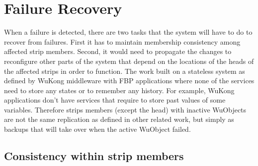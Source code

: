 \section{Failure Recovery}
\label{s:fr}

When a failure is detected, there are two tasks that the system will have to do
to recover from failures. First it has to maintain membership consistency among
affected strip members. Second, it would need to propagate the changes to
reconfigure other parts of the system that depend on the locations of the heads
of the affected strips in order to function. The work built on a stateless
system as defined by WuKong middleware with FBP applications where none of the
services need to store any states or to remember any history. For example,
WuKong applications don't have services that require to store past values of
some variables. Therefore strips members (except the head) with inactive
WuObjects are not the same replication as defined in other related work, but
simply as backups that will take over when the active WuObject failed.




\subsection{Consistency within strip members}

